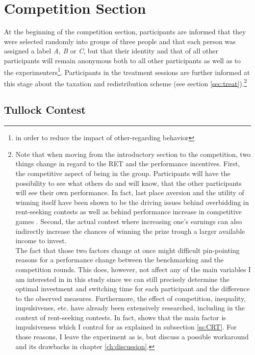     
    \section{Competition Section}
    \label{ss:compt}
    
    At the beginning of the competition section, participants are informed that they were selected randomly into groups of three people and that each person was assigned a label \textit{A, B} or \textit{C}, but that their identity and that of all other participants will remain anonymous both to all other participants as well as to the experimenters\footnote{in order to reduce the impact of other-regarding behavior}. Participants in the treatment sessions are further informed at this stage about the taxation and redistribution scheme (see section \ref{sec:treat}).\footnote{ Note that when moving from the introductory section to the competition, two things change in regard to the RET and the performance incentives. First, the competitive aspect of being in the group. Participants will have the possibility to see what others do and will know, that the other participants will see their own performance. In fact, last place aversion and the utility of winning itself have been shown to be the driving issues behind overbidding in rent-seeking contests as well as behind performance increase in competitive games \citep{sheremeta2013}. Second, the actual contest where increasing one's earnings can also indirectly increase the chances of winning the prize trough a larger available income to invest.\\
    The fact that those two factors change at once might difficult pin-pointing reasons for a performance change between the benchmarking and the competition rounds. This does, however, not affect any of the main variables I am interested in in this study since we can still precisely determine the optimal investment and switching time for each participant and the difference to the observed measures. Furthermore, the effect of competition, inequality, impulsivenes, etc. have already been extensively researched, including in the context of rent-seeking contests. In fact, \cite{sheremeta2016} shows that the main factor is impulsiveness which I control for as explained in subsection \ref{ss:CRT}. For those reasons, I leave the experiment as is, but discuss a possible workaround and its drawbacks in chapter \ref{ch:discussion}.} 
    
    \subsection{Tullock Contest}
    
